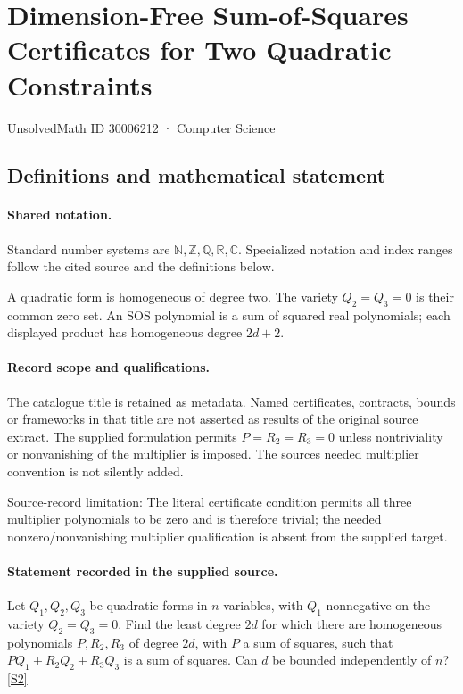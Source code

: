 \documentclass[11pt]{article}
\newcommand{\sref}[2]{\hyperlink{source:#1:#2}{[S#2]}}
\begin{document}
\setcounter{section}{30006211}
\section{Dimension-Free Sum-of-Squares Certificates for Two Quadratic Constraints}\label{30006212}
{\small\sffamily UnsolvedMath ID 30006212 · Computer Science}
\subsection{Definitions and mathematical statement}

\paragraph{Shared notation.}Standard number systems are $\mathbb N,\mathbb Z,\mathbb Q,\mathbb R,\mathbb C$. Specialized notation and index ranges follow the cited source and the definitions below.


A quadratic form is homogeneous of degree two. The variety $Q_2=Q_3=0$ is their common zero set. An SOS polynomial is a sum of squared real polynomials; each displayed product has homogeneous degree $2d+2$.
\paragraph{Record scope and qualifications.}
The catalogue title is retained as metadata. Named certificates, contracts, bounds or frameworks in that title are not asserted as results of the original source extract.
The supplied formulation permits $P=R_2=R_3=0$ unless nontriviality or nonvanishing of the multiplier is imposed. The source\textquotesingle s needed multiplier convention is not silently added.

Source-record limitation: The literal certificate condition permits all three multiplier polynomials to be zero and is therefore trivial; the needed nonzero/nonvanishing multiplier qualification is absent from the supplied target.
\paragraph{Statement recorded in the supplied source.}
Let $Q_1,Q_2,Q_3$ be quadratic forms in $n$ variables, with $Q_1$ nonnegative on the variety $Q_2=Q_3=0$. Find the least degree $2d$ for which there are homogeneous polynomials $P,R_2,R_3$ of degree $2d$, with $P$ a sum of squares, such that $PQ_1+R_2Q_2+R_3Q_3$ is a sum of squares. Can $d$ be bounded independently of $n$? \sref{30006212}{2}
\end{document}
